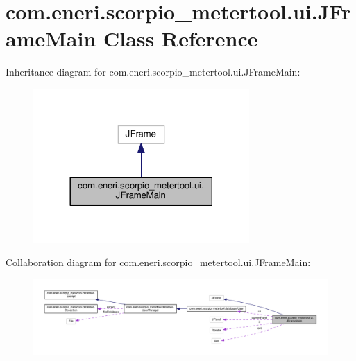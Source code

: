 \hypertarget{classcom_1_1eneri_1_1scorpio__metertool_1_1ui_1_1_j_frame_main}{}\section{com.\+eneri.\+scorpio\+\_\+metertool.\+ui.\+J\+Frame\+Main Class Reference}
\label{classcom_1_1eneri_1_1scorpio__metertool_1_1ui_1_1_j_frame_main}


Inheritance diagram for com.\+eneri.\+scorpio\+\_\+metertool.\+ui.\+J\+Frame\+Main\+:
\nopagebreak
\begin{figure}[H]
\begin{center}
\leavevmode
\includegraphics[width=233pt]{classcom_1_1eneri_1_1scorpio__metertool_1_1ui_1_1_j_frame_main__inherit__graph}
\end{center}
\end{figure}


Collaboration diagram for com.\+eneri.\+scorpio\+\_\+metertool.\+ui.\+J\+Frame\+Main\+:
\nopagebreak
\begin{figure}[H]
\begin{center}
\leavevmode
\includegraphics[width=350pt]{classcom_1_1eneri_1_1scorpio__metertool_1_1ui_1_1_j_frame_main__coll__graph}
\end{center}
\end{figure}
